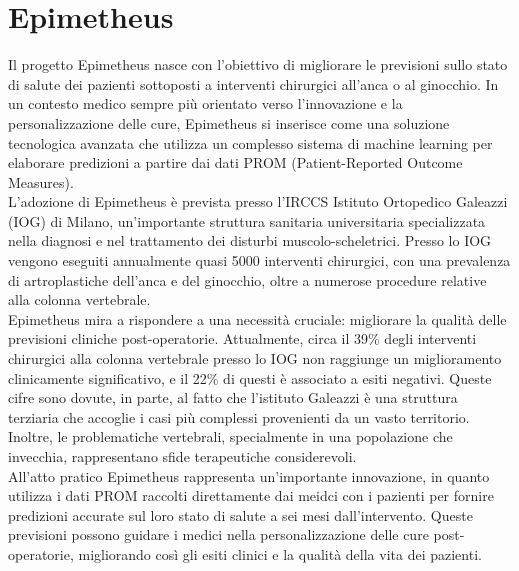 \chapter{Epimetheus}
\label{cap:epimetheus}

Il progetto Epimetheus nasce con l'obiettivo di migliorare le previsioni sullo stato di salute dei pazienti sottoposti a interventi chirurgici all'anca o al ginocchio. In un contesto medico sempre più orientato verso l'innovazione e la personalizzazione delle cure, Epimetheus si inserisce come una soluzione tecnologica avanzata che utilizza un complesso sistema di machine learning per elaborare predizioni a partire dai dati PROM (Patient-Reported Outcome Measures).\\

L'adozione di Epimetheus è prevista presso l'IRCCS Istituto Ortopedico Galeazzi (IOG) di Milano, un'importante struttura sanitaria universitaria specializzata nella diagnosi e nel trattamento dei disturbi muscolo-scheletrici. Presso lo IOG vengono eseguiti annualmente quasi 5000 interventi chirurgici, con una prevalenza di artroplastiche dell'anca e del ginocchio, oltre a numerose procedure relative alla colonna vertebrale.\\

Epimetheus mira a rispondere a una necessità cruciale: migliorare la qualità delle previsioni cliniche post-operatorie. Attualmente, circa il 39\% degli interventi chirurgici alla colonna vertebrale presso lo IOG non raggiunge un miglioramento clinicamente significativo, e il 22\% di questi è associato a esiti negativi. Queste cifre sono dovute, in parte, al fatto che l'istituto Galeazzi è una struttura terziaria che accoglie i casi più complessi provenienti da un vasto territorio. Inoltre, le problematiche vertebrali, specialmente in una popolazione che invecchia, rappresentano sfide terapeutiche considerevoli.\\

All'atto pratico Epimetheus rappresenta un'importante innovazione, in quanto utilizza i dati PROM raccolti direttamente dai meidci con i pazienti per fornire predizioni accurate sul loro stato di salute a sei mesi dall'intervento. Queste previsioni possono guidare i medici nella personalizzazione delle cure post-operatorie, migliorando così gli esiti clinici e la qualità della vita dei pazienti.\\

